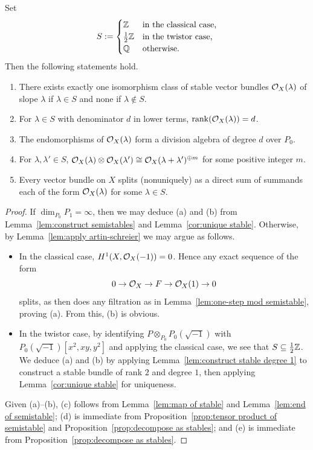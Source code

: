 \begin{theorem} \label{thm:abstract classification}
Set
\[
S := \begin{cases} \mathbb{Z} & \mbox{in the classical case,} \\
\tfrac{1}{2} \mathbb{Z} & \mbox{in the twistor case,} \\
\mathbb{Q} & \mbox{otherwise}.
\end{cases}
\]
Then the following statements hold.
\begin{enumerate}
\item[(a)]
There exists exactly one isomorphism class of stable vector bundles $\mathcal{O}_X(\lambda)$ of slope $\lambda$
if $\lambda \in S$ and none if $\lambda \notin S$.
\item[(b)]
For $\lambda \in S$ with denominator $d$ in lower terms, $\operatorname{rank}(\mathcal{O}_X(\lambda)) = d$.
\item[(c)]
The endomorphisms of $\mathcal{O}_X(\lambda)$ form a division algebra of degree $d$ over $P_0$.
\item[(d)]
For $\lambda, \lambda' \in S$, $\mathcal{O}_X(\lambda) \otimes \mathcal{O}_X(\lambda') \cong \mathcal{O}_X(\lambda+\lambda')^{\oplus m}$
for some positive integer $m$.
\item[(d)]
Every vector bundle on $X$ splits (nonuniquely) as a direct sum of summands each of the form $\mathcal{O}_X(\lambda)$ for some $\lambda \in S$.
\end{enumerate}
\end{theorem}
\begin{proof}
If $\dim_{P_0} P_1 = \infty$, then 
we may deduce (a) and (b) from Lemma~\ref{lem:construct semistables} and Lemma~\ref{cor:unique stable}. Otherwise, by Lemma~\ref{lem:apply artin-schreier} we may argue as follows.
\begin{itemize}
\item 
In the classical case, $H^1(X, \mathcal{O}_X(-1)) = 0$.
Hence any exact sequence of the form
\[
0 \to \mathcal{O}_X \to F \to \mathcal{O}_X(1) \to 0 
\]
splits, as then does any filtration as in Lemma~\ref{lem:one-step mod semistable}, proving (a).
From this, (b) is obvious.
\item
In the twistor case,
by identifying $P \otimes_{P_0} P_0(\sqrt{-1})$ with $P_0(\sqrt{-1})[x^2,xy,y^2]$ and applying the classical case, we see that $S \subseteq \tfrac{1}{2}\mathbb{Z}$.
We deduce (a) and (b) by applying Lemma~\ref{lem:construct stable degree 1} to construct a stable bundle of rank $2$ and degree $1$, then applying Lemma~\ref{cor:unique stable} for uniqueness.
\end{itemize}

Given (a)--(b), (c) follows from Lemma~\ref{lem:map of stable} and Lemma~\ref{lem:end of semistable}; 
(d) is immediate from Proposition~\ref{prop:tensor product of semistable} and Proposition~\ref{prop:decompose as stables};
and (e) is immediate from Proposition~\ref{prop:decompose as stables}.
\end{proof}
